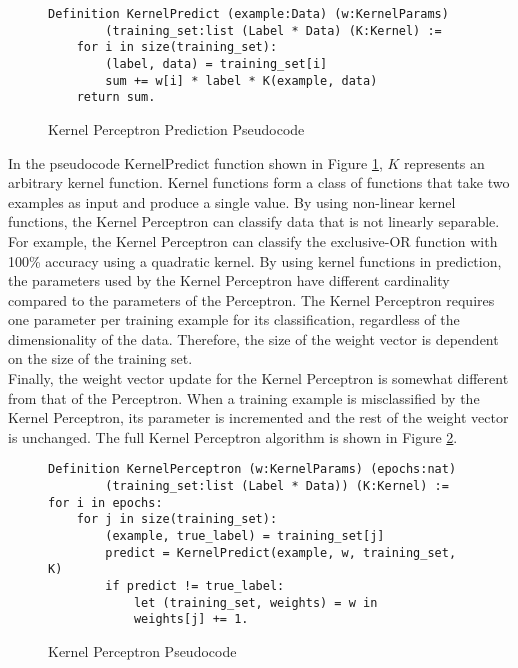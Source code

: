 \begin{figure}
    \caption{Kernel Perceptron Prediction Pseudocode}
    \label{KernelPerceptronPredictPseudo}
    \begin{lstlisting}
Definition KernelPredict (example:Data) (w:KernelParams) 
        (training_set:list (Label * Data) (K:Kernel) :=
    for i in size(training_set):
        (label, data) = training_set[i]
        sum += w[i] * label * K(example, data)
    return sum.
    \end{lstlisting}
\end{figure}

In the pseudocode KernelPredict function shown in Figure \ref{KernelPerceptronPredictPseudo}, $K$ represents an arbitrary kernel function. Kernel functions form a class of functions that take two examples as input and produce a single value. By using non-linear kernel functions, the Kernel Perceptron can classify data that is not linearly separable. For example, the Kernel Perceptron can classify the exclusive-OR function with 100\% accuracy
using a quadratic kernel. By using kernel functions in prediction, the parameters used by the Kernel Perceptron have different cardinality compared to the parameters of the Perceptron. The Kernel Perceptron requires one parameter per training example for its classification, regardless of the dimensionality of the data. Therefore, the size of the weight vector is dependent on the size of the training set. 
\\Finally, the weight vector update for the Kernel Perceptron is somewhat different from that of the Perceptron. When a training example is misclassified by the Kernel Perceptron, its parameter is incremented and the rest of the weight vector is unchanged. The full Kernel Perceptron algorithm is shown in Figure \ref{KernelPerceptronPseodo}.

\begin{figure}
    \caption{Kernel Perceptron Pseudocode}
    \label{KernelPerceptronPseodo}
    \begin{lstlisting}
Definition KernelPerceptron (w:KernelParams) (epochs:nat)
        (training_set:list (Label * Data)) (K:Kernel) :=
for i in epochs:
    for j in size(training_set):
        (example, true_label) = training_set[j]
        predict = KernelPredict(example, w, training_set, K)
        if predict != true_label:
            let (training_set, weights) = w in
            weights[j] += 1.
    \end{lstlisting}
\end{figure}

